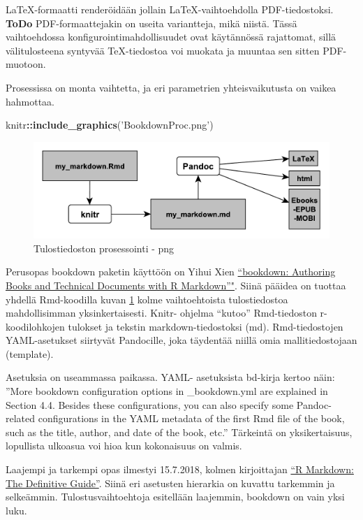 \documentclass[finnish,]{book}
\newenvironment{Shaded}{\begin{snugshade}}{\end{snugshade}}
\newcommand{\KeywordTok}[1]{\textcolor[rgb]{0.13,0.29,0.53}{\textbf{#1}}}
\newcommand{\NormalTok}[1]{#1}
\newcommand{\OperatorTok}[1]{\textcolor[rgb]{0.81,0.36,0.00}{\textbf{#1}}}
\newcommand{\StringTok}[1]{\textcolor[rgb]{0.31,0.60,0.02}{#1}}
\begin{document}
LaTeX-formaatti renderöidään jollain LaTeX-vaihtoehdolla PDF-tiedostoksi. \textbf{ToDo} PDF-formaattejakin on useita variantteja, mikä niistä. Tässä vaihtoehdossa konfigurointimahdollisuudet ovat käytännössä rajattomat, sillä välitulosteena syntyvää TeX-tiedostoa voi muokata ja muuntaa sen sitten PDF-muotoon.

Prosessissa on monta vaihtetta, ja eri parametrien yhteisvaikutusta on vaikea hahmottaa.

\begin{Shaded}
\begin{Highlighting}[]
\NormalTok{knitr}\OperatorTok{::}\KeywordTok{include_graphics}\NormalTok{(}\StringTok{'BookdownProc.png'}\NormalTok{)}
\end{Highlighting}
\end{Shaded}

\begin{figure}

{\centering \includegraphics[width=0.5\linewidth]{BookdownProc} 

}

\caption{Tulostiedoston prosessointi - png}\label{fig:bdprocess1}
\end{figure}

Perusopas bookdown paketin käyttöön on Yihui Xien \href{https://bookdown.org/yihui/bookdown/}{``bookdown: Authoring Books and Technical Documents with R Markdown''"}. Siinä pääidea on tuottaa yhdellä Rmd-koodilla kuvan
\ref{fig:bdprocess1} kolme vaihtoehtoista tulostiedostoa mahdollisimman yksinkertaisesti. Knitr- ohjelma ``kutoo'' Rmd-tiedoston r-koodilohkojen tulokset ja tekstin markdown-tiedostoksi (md). Rmd-tiedostojen YAML-asetukset siirtyvät Pandocille, joka täydentää niillä omia mallitiedostojaan (template).

Asetuksia on useammassa paikassa. YAML- asetuksista bd-kirja kertoo näin: ''More bookdown configuration options in \_bookdown.yml are explained in Section 4.4. Besides these configurations, you can also specify some Pandoc-related configurations in the YAML metadata of the first Rmd file of the book, such as the title, author, and date of the book, etc.'' Tärkeintä on yksikertaisuus, lopullista ulkoasua voi hioa kun kokonaisuus on valmis.

Laajempi ja tarkempi opas ilmestyi 15.7.2018, kolmen kirjoittajan \href{https://bookdown.org/yihui/rmarkdown/}{``R Markdown: The Definitive Guide''}. Siinä eri asetusten hierarkia on kuvattu tarkemmin ja selkeämmin. Tulostusvaihtoehtoja esitellään laajemmin, bookdown on vain yksi luku.
\end{document}
